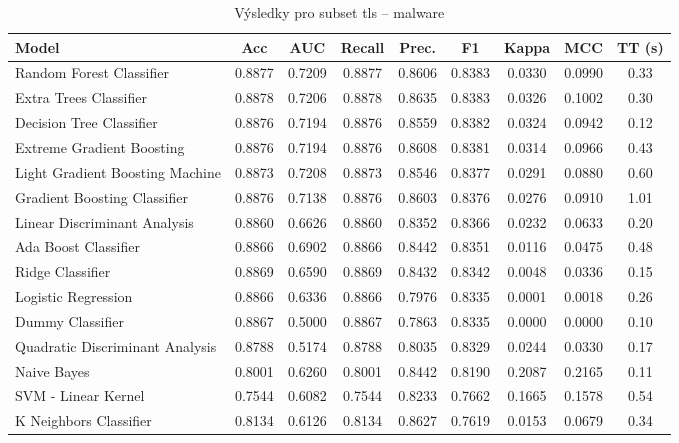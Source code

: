 \begin{table}[H]
  \centering
  \small
  \caption{Výsledky pro subset tls – malware}
  \begin{tabular}{|l|c|c|c|c|c|c|c|c|}
    \hline
    \textbf{Model} & \textbf{Acc} & \textbf{AUC} & \textbf{Recall} & \textbf{Prec.} & \textbf{F1} & \textbf{Kappa} & \textbf{MCC} & \textbf{TT (s)} \\
    \hline
    Random Forest Classifier & 0.8877 & 0.7209 & 0.8877 & 0.8606 & 0.8383 & 0.0330 & 0.0990 & 0.33 \\
    Extra Trees Classifier & 0.8878 & 0.7206 & 0.8878 & 0.8635 & 0.8383 & 0.0326 & 0.1002 & 0.30 \\
    Decision Tree Classifier & 0.8876 & 0.7194 & 0.8876 & 0.8559 & 0.8382 & 0.0324 & 0.0942 & 0.12 \\
    Extreme Gradient Boosting & 0.8876 & 0.7194 & 0.8876 & 0.8608 & 0.8381 & 0.0314 & 0.0966 & 0.43 \\
    Light Gradient Boosting Machine & 0.8873 & 0.7208 & 0.8873 & 0.8546 & 0.8377 & 0.0291 & 0.0880 & 0.60 \\
    Gradient Boosting Classifier & 0.8876 & 0.7138 & 0.8876 & 0.8603 & 0.8376 & 0.0276 & 0.0910 & 1.01 \\
    Linear Discriminant Analysis & 0.8860 & 0.6626 & 0.8860 & 0.8352 & 0.8366 & 0.0232 & 0.0633 & 0.20 \\
    Ada Boost Classifier & 0.8866 & 0.6902 & 0.8866 & 0.8442 & 0.8351 & 0.0116 & 0.0475 & 0.48 \\
    Ridge Classifier & 0.8869 & 0.6590 & 0.8869 & 0.8432 & 0.8342 & 0.0048 & 0.0336 & 0.15 \\
    Logistic Regression & 0.8866 & 0.6336 & 0.8866 & 0.7976 & 0.8335 & 0.0001 & 0.0018 & 0.26 \\
    Dummy Classifier & 0.8867 & 0.5000 & 0.8867 & 0.7863 & 0.8335 & 0.0000 & 0.0000 & 0.10 \\
    Quadratic Discriminant Analysis & 0.8788 & 0.5174 & 0.8788 & 0.8035 & 0.8329 & 0.0244 & 0.0330 & 0.17 \\
    Naive Bayes & 0.8001 & 0.6260 & 0.8001 & 0.8442 & 0.8190 & 0.2087 & 0.2165 & 0.11 \\
    SVM - Linear Kernel & 0.7544 & 0.6082 & 0.7544 & 0.8233 & 0.7662 & 0.1665 & 0.1578 & 0.54 \\
    K Neighbors Classifier & 0.8134 & 0.6126 & 0.8134 & 0.8627 & 0.7619 & 0.0153 & 0.0679 & 0.34 \\
    \hline
  \end{tabular}
\end{table}
\vspace{0.5cm}

